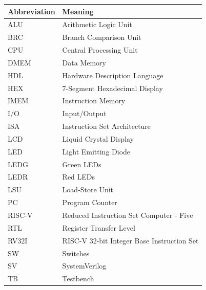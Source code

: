 \begin{tabular}{ll}
\textbf{Abbreviation} & \textbf{Meaning} \\ \hline
ALU & Arithmetic Logic Unit \\
BRC & Branch Comparison Unit \\
CPU & Central Processing Unit \\
DMEM & Data Memory \\
HDL & Hardware Description Language \\
HEX & 7-Segment Hexadecimal Display \\
IMEM & Instruction Memory \\
I/O & Input/Output \\
ISA & Instruction Set Architecture \\
LCD & Liquid Crystal Display \\
LED & Light Emitting Diode \\
LEDG & Green LEDs \\
LEDR & Red LEDs \\
LSU & Load-Store Unit \\
PC & Program Counter \\
RISC-V & Reduced Instruction Set Computer - Five \\
RTL & Register Transfer Level \\
RV32I & RISC-V 32-bit Integer Base Instruction Set \\
SW & Switches \\
SV & SystemVerilog \\
TB & Testbench \\
\end{tabular}

